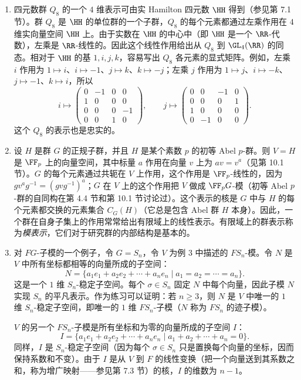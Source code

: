 \begin{enumerate}[label=(\arabic*)]
  \item 四元数群 $Q_8$ 的一个 $4$ 维表示可由实 Hamilton 四元数 $\HH$ 得到（参见第 7.1 节）。群 $Q_8$ 是 $\HH$ 的单位群的一个子群，$Q_8$ 的每个元素都通过左乘作用在 $4$ 维实向量空间 $\HH$ 上。由于实数在 $\HH$ 的中心中（即 $\HH$ 是一个 $\RR$-代数），左乘是 $\RR$-线性的。因此这个线性作用给出从 $Q_8$ 到 $\GL_4(\RR)$ 的同态。相对于 $\HH$ 的基 $1,i,j,k$，容易写出 $Q_8$ 各元素的显式矩阵。例如，左乘 $i$ 作用为 $1\mapsto i$、$i\mapsto-1$、$j\mapsto k$、$k\mapsto-j$；左乘 $j$ 作用为 $1\mapsto j$、$i\mapsto-k$、$j\mapsto-1$、$k\mapsto i$，所以
  \[
  i\mapsto
  \begin{pmatrix}
  0&-1&0&0\\
  1&0&0&0\\
  0&0&0&-1\\
  0&0&1&0
  \end{pmatrix},
  \qquad
  j\mapsto
  \begin{pmatrix}
  0&0&-1&0\\
  0&0&0&1\\
  1&0&0&0\\
  0&-1&0&0
  \end{pmatrix}.
  \]
  这个 $Q_8$ 的表示也是忠实的。

  \item 设 $H$ 是群 $G$ 的正规子群，并且 $H$ 是某个素数 $p$ 的初等 Abel $p$-群。则 $V=H$ 是 $\FF_p$ 上的向量空间，其中标量 $a$ 作用在向量 $v$ 上为 $av=v^a$（见第 10.1 节）。$G$ 的每个元素通过共轭在 $V$ 上作用，这个作用是 $\FF_p$-线性的，因为 $gv^ag^{-1}=(gvg^{-1})^a$；$G$ 在 $V$ 上的这个作用把 $V$ 做成 $\FF_pG$-模（初等 Abel $p$-群的自同构在第 4.4 节和第 10.1 节讨论过）。这个表示的核是 $G$ 中与 $H$ 的每个元素都交换的元素集合 $C_G(H)$（它总是包含 Abel 群 $H$ 本身）。因此，一个群在自身子集上的作用常常给出有限域上的线性表示。有限域上的群表示称为\emph{模表示}，它们对于研究群的内部结构是基本的。

  \item 对 $FG$-子模的一个例子，令 $G=S_n$，令 $V$ 为例 3 中描述的 $FS_n$-模。令 $N$ 是 $V$ 中所有坐标都相等的向量所成的子空间：
  \[
    N=\{a_1e_1+a_2e_2+\cdots+a_ne_n\mid a_1=a_2=\cdots=a_n\}.
  \]
  这是一个 $1$ 维 $S_n$-稳定子空间。每个 $\sigma\in S_n$ 固定 $N$ 中每个向量，因此子模 $N$ 实现 $S_n$ 的平凡表示。作为练习可以证明：若 $n\geq3$，则 $N$ 是 $V$ 中唯一的 $1$ 维 $S_n$-稳定子空间，即唯一的 $1$ 维 $FS_n$-子模（$N$ 称为 $FS_n$ 的迹子模）。

  $V$ 的另一个 $FS_n$-子模是所有坐标和为零的向量所成的子空间 $I$：
  \[
    I=\{a_1e_1+a_2e_2+\cdots+a_ne_n\mid a_1+a_2+\cdots+a_n=0\}.
  \]
  同样，$I$ 是 $S_n$-稳定子空间（因为每个 $\sigma\in S_n$ 只是置换每个向量的坐标，因而保持系数和不变）。由于 $I$ 是从 $V$ 到 $F$ 的线性变换（把一个向量送到其系数之和，称为增广映射——参见第 7.3 节）的核，$I$ 的维数为 $n-1$。


\end{enumerate}
